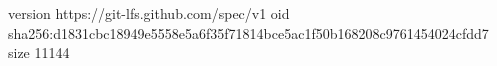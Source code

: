 version https://git-lfs.github.com/spec/v1
oid sha256:d1831cbc18949e5558e5a6f35f71814bce5ac1f50b168208c9761454024cfdd7
size 11144
